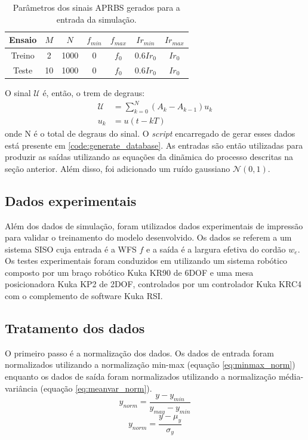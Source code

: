 \begin{table}[hbt!]
    \centering
    \begin{tabular}{|c|c|c|c|c|c|c|}
    \hline
    Ensaio & $M$ & $N$ & $f_{min}$ & $f_{max}$ & $Ir_{min}$ & $Ir_{max}$ \\
    \hline
    Treino & 2 & 1000 & 0 & $f_0$ & 0.6$Ir_0$ & $Ir_0$ \\
    \hline
    Teste & 10 & 1000 & 0 & $f_0$ & 0.6$Ir_0$ & $Ir_0$  \\
    \hline
    \end{tabular}
    \caption{Parâmetros dos sinais APRBS gerados para a entrada da simulação.}
    \label{tab:params_aprbs}
\end{table}

O sinal $\mathcal{U}$ é, então, o trem de degraus:
\begin{align}
    \mathcal{U} &= \sum_{k=0}^{N}(A_k-A_{k-1}) u_k \\
    u_k &= u(t-kT)
\end{align}
onde N é o total de degraus do sinal. 
O \textit{script} encarregado de gerar esses dados está presente em \ref{code:generate_database}. As entradas são então utilizadas para produzir as saídas utilizando as equações da dinãmica do processo descritas na seção anterior. Além disso, foi adicionado um ruído gaussiano $\mathcal{N}(0,1)$.

\subsection{Dados experimentais}
Além dos dados de simulação, foram utilizados dados experimentais de impressão para validar o treinamento do modelo desenvolvido. Os dados se referem a um sistema SISO cuja entrada é a WFS $f$ e a saída é a largura efetiva do cordão $w_e$. Os testes experimentais foram conduzidos em \cite{novais2023adaptative} utilizando um sistema robótico composto por um braço robótico Kuka KR90 de 6DOF e uma mesa posicionadora Kuka KP2 de 2DOF, controlados por um controlador Kuka KRC4 com o complemento de software Kuka RSI.

\subsection{Tratamento dos dados}
O primeiro passo é a normalização dos dados. Os dados de entrada foram normalizados utilizando a normalização min-max (equação \ref{eq:minmax_norm}) enquanto os dados de saída foram normalizados utilizando a normalização média-variância (equação \ref{eq:meanvar_norm}).
\begin{equation}
    \label{eq:minmax_norm}
    y_{norm} = \frac{y-y_{min}}{y_{may}-y_{min}} 
\end{equation}
\begin{equation}
    \label{eq:meanvar_norm}
    y_{norm} = \frac{y-\mu_y}{\sigma_y} 
\end{equation}

